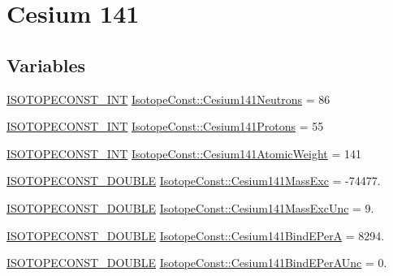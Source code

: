 \hypertarget{group___isotope_const-_cesium-_cs141}{}\section{Cesium 141}
\label{group___isotope_const-_cesium-_cs141}
\subsection*{Variables}
\begin{DoxyCompactItemize}
\item 
\mbox{\hyperlink{group___isotope_const-_macros_ga5f18360b3e99483a35c32d789e62621c}{I\+S\+O\+T\+O\+P\+E\+C\+O\+N\+S\+T\+\_\+\+I\+NT}} \mbox{\hyperlink{group___isotope_const-_cesium-_cs141_gac9f6926b9235b8a31032a99d99dce486}{Isotope\+Const\+::\+Cesium141\+Neutrons}} = 86
\item 
\mbox{\hyperlink{group___isotope_const-_macros_ga5f18360b3e99483a35c32d789e62621c}{I\+S\+O\+T\+O\+P\+E\+C\+O\+N\+S\+T\+\_\+\+I\+NT}} \mbox{\hyperlink{group___isotope_const-_cesium-_cs141_ga81450dbf4d01521ea78da0323074bd64}{Isotope\+Const\+::\+Cesium141\+Protons}} = 55
\item 
\mbox{\hyperlink{group___isotope_const-_macros_ga5f18360b3e99483a35c32d789e62621c}{I\+S\+O\+T\+O\+P\+E\+C\+O\+N\+S\+T\+\_\+\+I\+NT}} \mbox{\hyperlink{group___isotope_const-_cesium-_cs141_ga9388f9b23b23d38da663c9b44bcb4281}{Isotope\+Const\+::\+Cesium141\+Atomic\+Weight}} = 141
\item 
\mbox{\hyperlink{group___isotope_const-_macros_ga8f45a7272ce02c0b4c65c44636ed719a}{I\+S\+O\+T\+O\+P\+E\+C\+O\+N\+S\+T\+\_\+\+D\+O\+U\+B\+LE}} \mbox{\hyperlink{group___isotope_const-_cesium-_cs141_ga19293efc6dc8295963bffff64e0a9a12}{Isotope\+Const\+::\+Cesium141\+Mass\+Exc}} = -\/74477.
\item 
\mbox{\hyperlink{group___isotope_const-_macros_ga8f45a7272ce02c0b4c65c44636ed719a}{I\+S\+O\+T\+O\+P\+E\+C\+O\+N\+S\+T\+\_\+\+D\+O\+U\+B\+LE}} \mbox{\hyperlink{group___isotope_const-_cesium-_cs141_ga2c0958a382203ffbfe5a8e5d909d9f9e}{Isotope\+Const\+::\+Cesium141\+Mass\+Exc\+Unc}} = 9.
\item 
\mbox{\hyperlink{group___isotope_const-_macros_ga8f45a7272ce02c0b4c65c44636ed719a}{I\+S\+O\+T\+O\+P\+E\+C\+O\+N\+S\+T\+\_\+\+D\+O\+U\+B\+LE}} \mbox{\hyperlink{group___isotope_const-_cesium-_cs141_ga1e3cce350283ce5b87bf91e69a224aae}{Isotope\+Const\+::\+Cesium141\+Bind\+E\+PerA}} = 8294.
\item 
\mbox{\hyperlink{group___isotope_const-_macros_ga8f45a7272ce02c0b4c65c44636ed719a}{I\+S\+O\+T\+O\+P\+E\+C\+O\+N\+S\+T\+\_\+\+D\+O\+U\+B\+LE}} \mbox{\hyperlink{group___isotope_const-_cesium-_cs141_ga496d416716a02af5a4814e257123e267}{Isotope\+Const\+::\+Cesium141\+Bind\+E\+Per\+A\+Unc}} = 0.

\end{DoxyCompactItemize}
